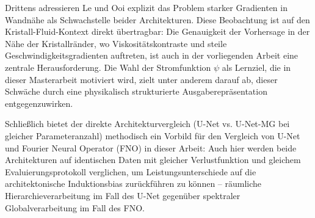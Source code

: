 \documentclass[a4paper,12pt]{article}
\begin{document}
Drittens adressieren Le und Ooi explizit das Problem starker Gradienten in Wandnähe als
Schwachstelle beider Architekturen. Diese Beobachtung ist auf den Kristall-Fluid-Kontext
direkt übertragbar: Die Genauigkeit der Vorhersage in der Nähe der Kristallränder,
wo Viskositätskontraste und steile Geschwindigkeitsgradienten auftreten, ist auch in der
vorliegenden Arbeit eine zentrale Herausforderung. Die Wahl der Stromfunktion $\psi$
als Lernziel, die in dieser Masterarbeit motiviert wird, zielt unter anderem darauf ab,
dieser Schwäche durch eine physikalisch strukturierte Ausgaberepräsentation entgegenzuwirken.

Schließlich bietet der direkte Architekturvergleich (U-Net vs. U-Net-MG bei gleicher
Parameteranzahl) methodisch ein Vorbild für den Vergleich von U-Net und Fourier Neural
Operator (FNO) in dieser Arbeit: Auch hier werden beide Architekturen auf identischen
Daten mit gleicher Verlustfunktion und gleichem Evaluierungsprotokoll verglichen, um
Leistungsunterschiede auf die architektonische Induktionsbias zurückführen zu können --
räumliche Hierarchieverarbeitung im Fall des U-Net gegenüber spektraler Globalverarbeitung im Fall des FNO.
\end{document}
